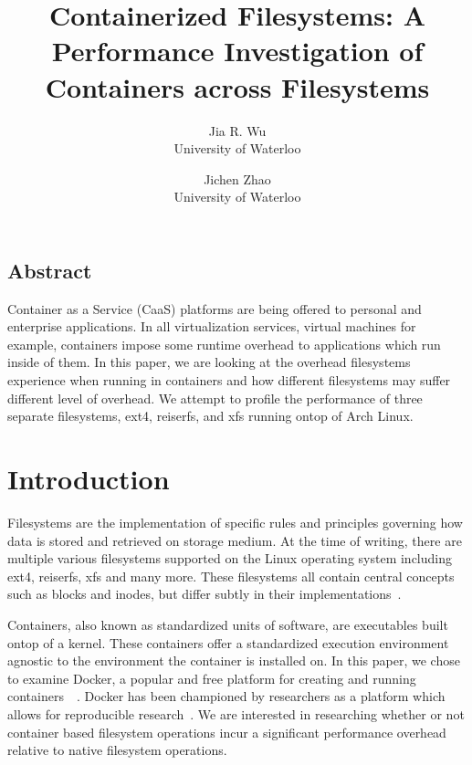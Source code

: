 \documentclass[letterpaper,twocolumn,10pt]{article}
\begin{document}
\date{}

\title{\Large \bf Containerized Filesystems: A Performance Investigation of Containers across Filesystems}

\author{
{\rm Jia R. Wu}\\
University of Waterloo
\and
{\rm Jichen Zhao}\\
University of Waterloo
} %

\maketitle

\thispagestyle{empty}


\subsection*{Abstract}

Container as a Service (CaaS) platforms are being offered to personal and enterprise applications. In all virtualization services, virtual machines for example, containers impose some runtime overhead to applications which run inside of them. In this paper, we are looking at the overhead filesystems experience when running in containers and how different filesystems may suffer different level of overhead. We attempt to profile the performance of three separate filesystems, ext4, reiserfs, and xfs running ontop of Arch Linux.



\section{Introduction}
Filesystems are the implementation of specific rules and principles governing how data is stored and retrieved on storage medium. At the time of writing, there are multiple various filesystems supported on the Linux operating system including ext4, reiserfs, xfs and many more. These filesystems all contain central concepts such as blocks and inodes, but differ subtly in their implementations~\cite{TLDP}.

Containers, also known as standardized units of software, are executables built ontop of a kernel. These containers offer a standardized execution environment agnostic to the environment the container is installed on. In this paper, we chose to examine Docker, a popular and free platform for creating and running containers~\cite{anderson2015docker}~\cite{rad2017introduction}. Docker has been championed by researchers as a platform which allows for reproducible research~\cite{boettiger2015introduction}. We are interested in researching whether or not container based filesystem operations incur a significant performance overhead relative to native filesystem operations.
\end{document}
